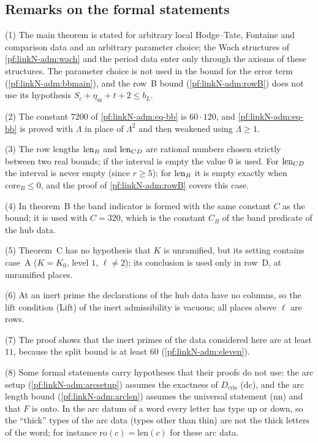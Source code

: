 \subsection{Remarks on the formal statements}\label{pf:linkN-adm:remarks}

\begin{remark}\label{pf:linkN-adm:rem}
(1) The main theorem is stated for arbitrary local Hodge--Tate, Fontaine and comparison data and an arbitrary parameter
choice; the Wach structures of \cref{pf:linkN-adm:wach} and the period data enter only through the axioms of these
structures. The parameter choice is not used in the bound for the error term (\cref{pf:linkN-adm:bbmain}), and the row~B
bound (\cref{pf:linkN-adm:rowB}) does not use its hypothesis $S_c+\eta_{\mathrm{sz}}+t+2\le b_L$.

(2) The constant $7200$ of \eqref{pf:linkN-adm:eq-bb} is $60\cdot120$, and \eqref{pf:linkN-adm:eq-bb} is proved with $\Lambda$
in place of $\Lambda^2$ and then weakened using $\Lambda\ge1$.

(3) The row lengths $\operatorname{len}_B$ and $\operatorname{len}_{CD}$ are rational numbers chosen strictly between two real
bounds; if the interval is empty the value $0$ is used. For $\operatorname{len}_{CD}$ the interval is never empty (since $r\ge5$);
for $\operatorname{len}_B$ it is empty exactly when $\mathrm{core}_B\le0$, and the proof of \cref{pf:linkN-adm:rowB} covers this
case.

(4) In theorem~B the band indicator is formed with the same constant $C$ as the bound; it is used with $C=320$, which is
the constant $C_B$ of the band predicate of the hub data.

(5) Theorem~C has no hypothesis that $K$ is unramified, but its setting contains case~A ($K=K_0$, level $1$,
$\ell\ne2$); its conclusion is used only in row~D, at unramified places.

(6) At an inert prime the declarations of the hub data have no columns, so the lift condition (Lift) of the inert
admissibility is vacuous; all places above $\ell$ are rows.

(7) The proof shows that the inert primes of the data considered here are at least $11$, because the split bound is at
least $60$ (\cref{pf:linkN-adm:eleven}).

(8) Some formal statements carry hypotheses that their proofs do not use: the arc setup (\cref{pf:linkN-adm:arcsetup})
assumes the exactness of $D_{\mathrm{cris}}$ (dc), and the arc length bound (\cref{pf:linkN-adm:arclen}) assumes the
universal statement (nn) and that $F$ is onto. In the arc datum of a word every letter has type up or down, so the
``thick'' types of the arc data (types other than thin) are not the thick letters of the word; for instance
$\mathrm{ro}(c)=\mathrm{len}(c)$ for these arc data.
\end{remark}

